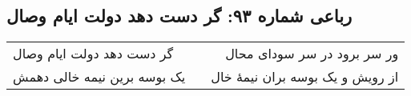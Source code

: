 \begin{center}
\section*{رباعی شماره ۹۳: گر دست دهد دولت ایام وصال}
\label{sec:093}
\begin{longtable}{l p{0.5cm} r}
گر دست دهد دولت ایام وصال
&&
ور سر برود در سر سودای محال
\\
یک بوسه برین نیمه خالی دهمش
&&
از رویش و یک بوسه بران نیمهٔ خال
\\
\end{longtable}
\end{center}
